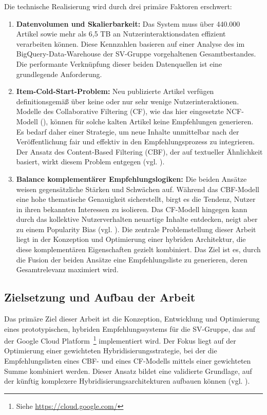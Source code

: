 Die technische Realisierung wird durch drei primäre Faktoren erschwert:



\begin{enumerate}
    \item \textbf{Datenvolumen und Skalierbarkeit:} Das System muss über 440.000 Artikel sowie mehr als 6,5 TB an 
    Nutzerinteraktionsdaten effizient verarbeiten können. Diese Kennzahlen basieren auf einer Analyse des im 
    BigQuery-Data-Warehouse der \ac{SV-Gruppe} vorgehaltenen Gesamtbestandes. Die performante Verknüpfung dieser beiden 
    Datenquellen ist eine grundlegende Anforderung.
    
    \item \textbf{Item-Cold-Start-Problem:} Neu publizierte Artikel verfügen definitionsgemäß über keine 
    oder nur sehr wenige Nutzerinteraktionen. Modelle des Collaborative Filtering (CF), wie das hier eingesetzte \ac{NCF}-Modell (\cite{he_neural_2017}), 
    können für solche kalten Artikel keine Empfehlungen generieren. Es bedarf daher einer Strategie, 
    um neue Inhalte unmittelbar nach der Veröffentlichung fair und effektiv in den Empfehlungsprozess zu integrieren. 
    Der Ansatz des Content-Based Filtering (CBF), der auf textueller Ähnlichkeit basiert, wirkt diesem Problem entgegen (vgl. \cite{Lops_CBRS_SOTA_2011}).
    
    \item \textbf{Balance komplementärer Empfehlungslogiken:} Die beiden Ansätze weisen gegensätzliche 
    Stärken und Schwächen auf. Während das \ac{CBF}-Modell eine hohe thematische Genauigkeit sicherstellt, 
    birgt es die Tendenz, Nutzer in ihren bekannten Interessen zu isolieren. 
    Das \ac{CF}-Modell hingegen kann durch das kollektive Nutzerverhalten neuartige Inhalte entdecken, 
    neigt aber zu einem Popularity Bias (vgl. \cite{Abdollahpouri_Popularity_Bias_2019}). 
    Die zentrale Problemstellung dieser Arbeit liegt in der Konzeption und Optimierung einer 
    hybriden Architektur, die diese komplementären Eigenschaften gezielt kombiniert. 
    Das Ziel ist es, durch die Fusion der beiden Ansätze eine Empfehlungsliste zu generieren, 
    deren Gesamtrelevanz maximiert wird.
\end{enumerate}

\subsection{Zielsetzung und Aufbau der Arbeit}
\label{sec:zielsetzung}
Das primäre Ziel dieser Arbeit ist die Konzeption, Entwicklung und Optimierung eines prototypischen, 
hybriden Empfehlungssystems für die \ac{SV-Gruppe}, das auf der Google Cloud Platform~\footnote{Siehe \url{https://cloud.google.com/}} implementiert wird. 
Der Fokus liegt auf der Optimierung einer gewichteten Hybridisierungsstrategie, bei der die Empfehlungslisten 
eines \ac{CBF}- und eines \ac{CF}-Modells mittels einer gewichteten Summe 
kombiniert werden. Dieser Ansatz bildet eine validierte Grundlage, auf der künftig komplexere 
Hybridisierungsarchitekturen aufbauen können (vgl. \cite{burke_hybrid_2002}).


